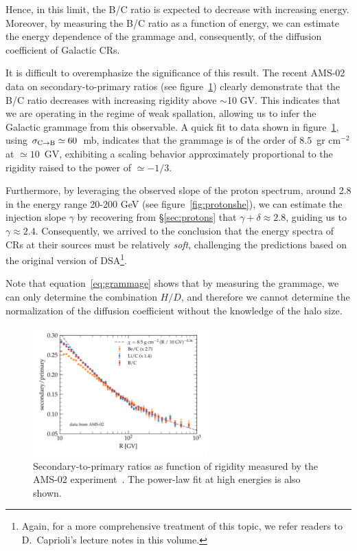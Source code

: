 Hence, in this limit, the B/C ratio is expected to decrease with increasing energy. 
%
Moreover, by measuring the B/C ratio as a function of energy, we can estimate the energy dependence of the grammage and, consequently, of the diffusion coefficient of Galactic CRs.

It is difficult to overemphasize the significance of this result. 
%
The recent AMS-02 data on secondary-to-primary ratios (see figure~\ref{fig:bcams02}) clearly demonstrate that the B/C ratio decreases with increasing rigidity above $\sim$10 GV. %
%
This indicates that we are operating in the regime of weak spallation, allowing us to infer the Galactic grammage from this observable.
%
A quick fit to data shown in figure~\ref{fig:bcams02}, using $\sigma_{\rm C \rightarrow B} \simeq 60$~mb, indicates that the grammage is of the order of $8.5$~gr cm$^{-2}$ at $\simeq 10$~GV, exhibiting a scaling behavior approximately proportional to the rigidity raised to the power of $\simeq -1/3$. 

Furthermore, by leveraging the observed slope of the proton spectrum, around 2.8 in the energy range 20-200 GeV (see figure~\ref{fig:protonshe}), we can estimate the injection slope $\gamma$ by recovering from \S\ref{sec:protons} that $\gamma + \delta \approx 2.8$, guiding us to $\gamma \approx 2.4$. 
%
Consequently, we arrived to the conclusion that the energy spectra of CRs at their sources must be relatively \emph{soft}, challenging the predictions based on the original version of DSA\footnote{Again, for a more comprehensive treatment of this topic, we refer readers to D.~Caprioli's lecture notes in this volume.}.

Note that equation~\eqref{eq:grammage} shows that by measuring the grammage, we can only determine the combination $H/D$, and therefore we cannot determine the normalization of the diffusion coefficient without the knowledge of the halo size.

\begin{figure}
\centering
\includegraphics[width=0.6\textwidth]{figures/LiBeB_C_AMS02.pdf}
\caption{Secondary-to-primary ratios as function of rigidity measured by the AMS-02 experiment~\cite{AMS02libeb}. The power-law fit at high energies is also shown.}
\label{fig:bcams02}
\end{figure}


